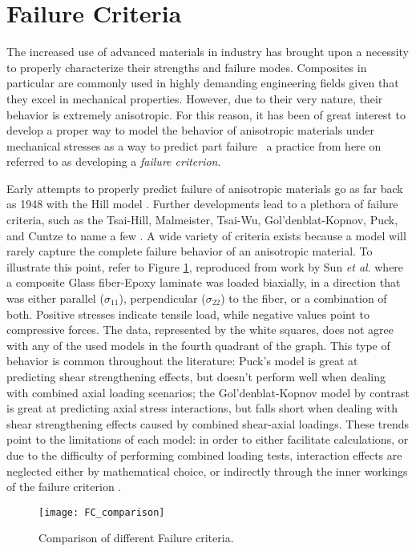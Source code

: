 \documentclass[main.tex]{subfiles}
\begin{document}
\section{Failure Criteria}\label{sec:FC}   
The increased use of advanced materials in industry has brought upon a necessity to properly characterize their strengths and failure modes. Composites in particular are commonly used in highly demanding engineering fields given that they excel in mechanical properties. However, due to their very nature, their behavior is extremely anisotropic. For this reason, it has been of great interest to develop a proper way to model the behavior of anisotropic materials under mechanical stresses as a way to predict part failure \textendash~a practice from here on referred to as developing a \emph{failure criterion}. 

Early attempts to properly predict failure of anisotropic materials go as far back as 1948 with the Hill model \cite{Osswald2017a}. Further developments lead to a plethora of failure criteria, such as the Tsai-Hill, Malmeister, Tsai-Wu, Gol'denblat-Kopnov, Puck, and Cuntze to name a few \cite{Osswald2017a,Osswald2015}. A wide variety of criteria exists because a model will rarely capture the complete failure behavior of an anisotropic material. To illustrate this point, refer to Figure \ref{fig:FCComp}, reproduced from work by Sun \emph{et al}. \cite{Sun1996} where a composite Glass fiber-Epoxy laminate was loaded biaxially, in a direction that was either parallel ($\sigma_{11}$), perpendicular ($\sigma_{22}$) to the fiber, or a combination of both. Positive stresses indicate tensile load, while negative values point to compressive forces. The data, represented by the white squares, does not agree with any of the used models in the fourth quadrant of the graph. This type of behavior is common throughout the literature: Puck's model is great at predicting shear strengthening effects, but doesn't perform well when dealing with combined axial loading scenarios; the Gol'denblat-Kopnov model by contrast is great at predicting axial stress interactions, but falls short when dealing with shear strengthening effects caused by combined shear-axial loadings. These trends point to the limitations of each model: in order to either facilitate calculations, or due to the difficulty of performing combined loading tests, interaction effects are neglected either by mathematical choice, or indirectly through the inner workings of the failure criterion \cite{Osswald2017a}.  

\begin{figure}[h]
	\center
	\texttt{[image: FC\_comparison]}
	\caption{Comparison of different Failure criteria. \cite{Sun1996}} \label{fig:FCComp}
\end{figure}     
\end{document}
